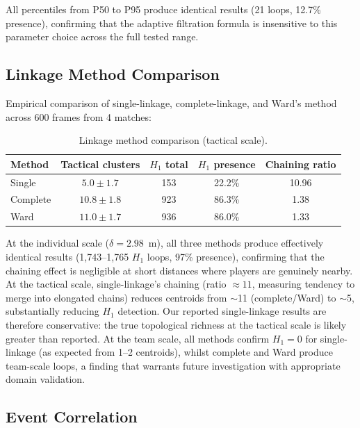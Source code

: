All percentiles from P50 to P95 produce identical results (21 loops, 12.7\% presence), confirming that the adaptive filtration formula is insensitive to this parameter choice across the full tested range.

\subsection{Linkage Method Comparison}
\label{sec:linkage}

Empirical comparison of single-linkage, complete-linkage, and Ward's method across 600 frames from 4 matches:

\begin{table}[H]
  \centering
  \caption{Linkage method comparison (tactical scale).}
  \label{tab:linkage}
  \begin{tabular}{@{}lcccc@{}}
    \toprule
    Method & Tactical clusters & \(H_1\) total & \(H_1\) presence & Chaining ratio \\
    \midrule
    Single   & \(5.0\pm1.7\)  & 153 & 22.2\% & 10.96 \\
    Complete & \(10.8\pm1.8\) & 923 & 86.3\% & 1.38 \\
    Ward     & \(11.0\pm1.7\) & 936 & 86.0\% & 1.33 \\
    \bottomrule
  \end{tabular}
\end{table}

At the individual scale (\(\delta=2.98\)~m), all three methods produce effectively identical results (1,743--1,765 \(H_1\) loops, 97\% presence), confirming that the chaining effect is negligible at short distances where players are genuinely nearby. At the tactical scale, single-linkage's chaining (ratio \(\approx 11\), measuring tendency to merge into elongated chains) reduces centroids from \(\sim\)11 (complete/Ward) to \(\sim\)5, substantially reducing \(H_1\) detection. Our reported single-linkage results are therefore conservative: the true topological richness at the tactical scale is likely greater than reported. At the team scale, all methods confirm \(H_1=0\) for single-linkage (as expected from 1--2 centroids), whilst complete and Ward produce team-scale loops, a finding that warrants future investigation with appropriate domain validation.

\subsection{Event Correlation}
\label{sec:event_correlation}

